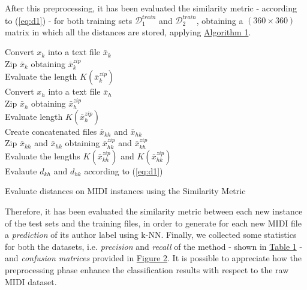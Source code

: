 \documentclass[a4paper]{article}
\begin{document}
	After this preprocessing, it has been evaluated the similarity metric - according to (\ref{eq:d1}) - for both training sets $\mathcal{D}_1^{train}$ and $\mathcal{D}_2^{train}$, obtaining a $(360 \times 360)$ matrix in which all the distances are stored, applying \hyperref[alg_1]{Algorithm 1}.
	
	\begin{algorithm}[!h]
		{
			Convert $x_k$ into a text file $\bar{x}_k$\\
			Zip $\bar{x}_k$ obtaining $\bar{x}_k^{zip}$\\
			Evaluate the length $K\left(\bar{x}_k^{zip}\right)$\\
			{
				Convert $x_h$ into a text file $\bar{x}_h$\\
				Zip $\bar{x}_h$ obtaining $\bar{x}_h^{zip}$\\
				Evaluate length $K\left(\bar{x}_h^{zip}\right)$\\
				
				\vspace{5px}
				Create concatenated files $\bar{x}_{kh}$ and $\bar{x}_{hk}$\\
				Zip $\bar{x}_{kh}$ and $\bar{x}_{hk}$ obtaining $\bar{x}_{hk}^{zip}$ and $\bar{x}_{kh}^{zip}$\\
				Evaluate the lengths $K\left(\bar{x}_{kh}^{zip}\right)$ and $K\left(\bar{x}_{hk}^{zip}\right)$\\
				\vspace{5px}
				Evalaute $d_{kh}$ and $d_{hk}$ according to (\ref{eq:d1})}}

		\vspace{10px}
		\label{alg_1}
		\caption{Evaluate distances on MIDI instances using the Similarity Metric}
	\end{algorithm}
	
	Therefore, it has been evaluated the similarity metric between each new instance of the test sets and the training files, in order to generate for each new MIDI file a \textit{prediction} of its author label using k-NN. Finally, we collected some statistics for both the datasets, i.e. \textit{precision} and \textit{recall} of the method - shown in \hyperref[tab:stats]{Table 1} - and \textit{confusion matrices} provided in \hyperref[fig:cm]{Figure 2}. It is possible to appreciate how the preprocessing phase enhance the classification results with respect to the raw MIDI dataset. 
	
\end{document}
